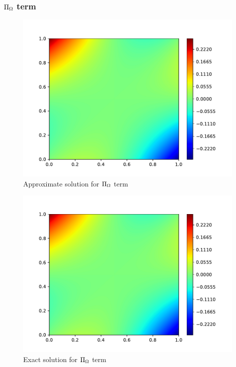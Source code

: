 \subsubsection{$\Pi_{\Omega}$ term}
\begin{figure}[H]
    \includegraphics[height=0.35\textheight]{media/enstrophy-transport-terms/SGS-trans-approx.pdf}
    \caption{Approximate solution for $\Pi_{\Omega}$ term}
    \label{fig:pi-approx}
\end{figure}
\begin{figure}[H]
    \includegraphics[height=0.35\textheight]{media/enstrophy-transport-terms/SGS-trans-exact.pdf}
    \caption{Exact solution for $\Pi_{\Omega}$ term}
    \label{fig:pi-exact}
\end{figure}

